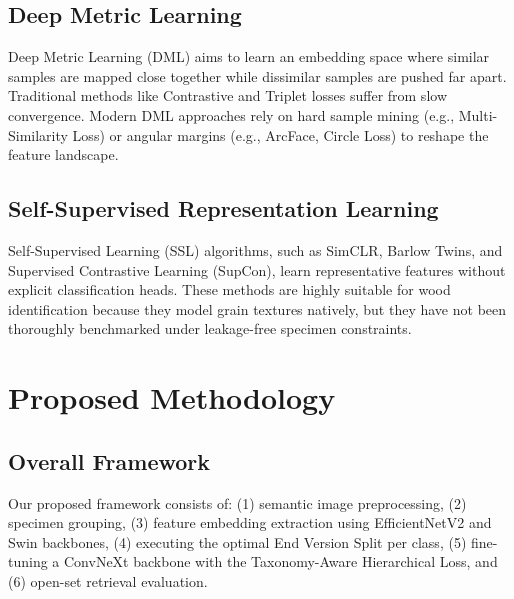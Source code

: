 \documentclass[journal,onecolumn]{IEEEtran}
\begin{document}
\subsection{Deep Metric Learning}
Deep Metric Learning (DML) aims to learn an embedding space where similar samples are mapped close together while dissimilar samples are pushed far apart. Traditional methods like Contrastive and Triplet losses suffer from slow convergence. Modern DML approaches rely on hard sample mining (e.g., Multi-Similarity Loss) or angular margins (e.g., ArcFace, Circle Loss) to reshape the feature landscape.

\subsection{Self-Supervised Representation Learning}
Self-Supervised Learning (SSL) algorithms, such as SimCLR, Barlow Twins, and Supervised Contrastive Learning (SupCon), learn representative features without explicit classification heads. These methods are highly suitable for wood identification because they model grain textures natively, but they have not been thoroughly benchmarked under leakage-free specimen constraints.

\section{Proposed Methodology}

\subsection{Overall Framework}
Our proposed framework consists of: (1) semantic image preprocessing, (2) specimen grouping, (3) feature embedding extraction using EfficientNetV2 and Swin backbones, (4) executing the optimal End Version Split per class, (5) fine-tuning a ConvNeXt backbone with the Taxonomy-Aware Hierarchical Loss, and (6) open-set retrieval evaluation.
\end{document}
